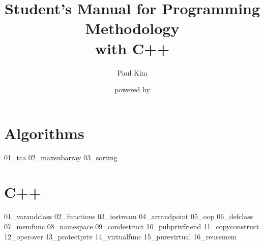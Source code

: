 \documentclass[10pt,openany,a4pper]{book}
\begin{document}
\begin{titlepage}
    \title{Student's Manual for Programming Methodology\\{\Large with C++}}
    \author{Paul Kim}
    \date{powered by \LaTeXe{}}
\maketitle
\end{titlepage}
\tableofcontents
\newpage

\part{Algorithms}

{01_tca}
{02_maxsubarray}
{03_sorting}

\part{C++}

{01_varandclass}
{02_functions}
{03_iostream}
{04_arrandpoint}
{05_oop}
{06_defclass}
{07_memfunc}
{08_namespace}
{09_condestruct}
{10_pubprivfriend}
{11_copyconstruct}
{12_operover}
{13_protectpriv}
{14_virtualfunc}
{15_purevirtual}
{16_reusemem}
\end{document}
